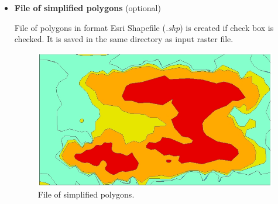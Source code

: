 \begin{itemize}
\item{\textbf{File of simplified polygons} (optional)

  File of polygons in format Esri Shapefile (\textit{.shp}) is created if check
  box is checked. It is saved in the same directory as input raster
  file.}

\begin{figure}[H]
    \centering
      \includegraphics[width=350pt]{./pictures/vystupni_polygony.jpg}
      \caption{File of simplified polygons.}
      \label{fig:poly}
\end{figure}

\end{itemize}
